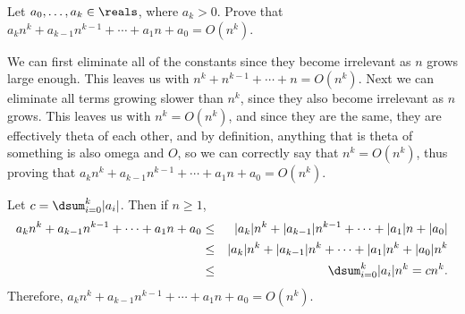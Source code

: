 \begin{eval}
Let $a_0,\ldots, a_k\in \reals$, where $a_k>0$.
Prove that $a_kn^k+a_{k-1}n^{k-1}+\cdots+a_1n+a_0=O(n^k)$.
\begin{ssolenum}
\item
We can first eliminate all of the constants since they become irrelevant as $n$ grows large enough.
This leaves us with $n^k+n^{k-1}+\cdots+n=O(n^k)$.  Next we can eliminate
all terms growing slower than $n^k$, since they also become irrelevant as $n$ grows.
This leaves us with $n^k=O(n^k)$, and since they are the same, they are effectively theta
of each other, and by definition, anything that is theta of something is also omega and $O$,
so we can correctly say that $n^k=O(n^k)$, thus proving that 
$a_kn^k+a_{k-1}n^{k-1}+\cdots+a_1n+a_0=O(n^k)$.

\noindent
\evallinethree
\item
Let $c=\dsum_{i=0}^k |a_i|$.  
Then if $n\geq 1$, 
\begin{eqnarray*}
a_kn^k+a_{k-1}n^{k-1}+\cdots+a_1n+a_0&\leq&|a_k|n^k+|a_{k-1}|n^{k-1}+\cdots+|a_1|n+|a_0|\\
&\leq&|a_k|n^k+|a_{k-1}|n^k+\cdots+|a_1|n^k+|a_0|n^k\\
&\leq&\dsum_{i=0}^k |a_i|n^k=cn^k.
\end{eqnarray*}
Therefore, $a_kn^k+a_{k-1}n^{k-1}+\cdots+a_1n+a_0=O(n^k)$.


\end{ssolenum}
\end{eval}

